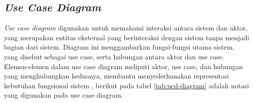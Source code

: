 \subsection{\textit{Use Case Diagram}}

\textit{Use case diagram} digunakan untuk memahami interaksi antara sistem dan aktor, yang merupakan entitas eksternal yang berinteraksi dengan sistem tanpa menjadi bagian dari sistem. Diagram ini menggambarkan fungsi-fungsi utama sistem, yang disebut sebagai use case, serta hubungan antara aktor dan use case. Elemen-elemen dalam use case diagram meliputi aktor, use case, dan hubungan yang menghubungkan keduanya, membantu menyederhanakan representasi kebutuhan fungsional sistem \cite{booch2005unified}, berikut pada tabel \ref{tab:ucd-diagram} adalah notasi yang digunakan pada use case diagram.

